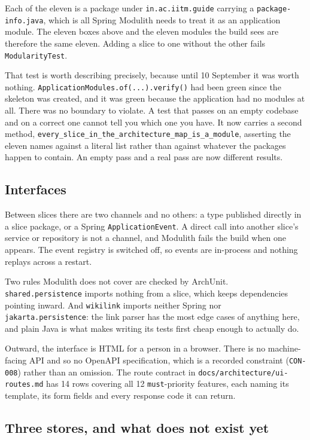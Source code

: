 \documentclass[11pt]{article}
\begin{document}
Each of the eleven is a package under \texttt{in.ac.iitm.guide} carrying a \texttt{package-info.java},
which is all Spring Modulith needs to treat it as an application module. The eleven boxes above and
the eleven modules the build sees are therefore the same eleven. Adding a slice to one without the
other fails \texttt{ModularityTest}.

That test is worth describing precisely, because until 10 September it was worth nothing.
\texttt{ApplicationModules.of(...).verify()} had been green since the skeleton was created, and it
was green because the application had no modules at all. There was no boundary to violate. A test
that passes on an empty codebase and on a correct one cannot tell you which one you have. It now
carries a second method, \texttt{every\_slice\_in\_the\_architecture\_map\_is\_a\_module}, asserting
the eleven names against a literal list rather than against whatever the packages happen to contain.
An empty pass and a real pass are now different results.

\subsection{Interfaces}

Between slices there are two channels and no others: a type published directly in a slice package,
or a Spring \texttt{ApplicationEvent}. A direct call into another slice's service or repository is
not a channel, and Modulith fails the build when one appears. The event registry is switched off, so
events are in-process and nothing replays across a restart.

Two rules Modulith does not cover are checked by ArchUnit. \texttt{shared.persistence} imports
nothing from a slice, which keeps dependencies pointing inward. And \texttt{wikilink} imports neither
Spring nor \texttt{jakarta.persistence}: the link parser has the most edge cases of anything here,
and plain Java is what makes writing its tests first cheap enough to actually do.

Outward, the interface is HTML for a person in a browser. There is no machine-facing API and so no
OpenAPI specification, which is a recorded constraint (\texttt{CON-008}) rather than an omission. The
route contract in \texttt{docs/architecture/ui-routes.md} has 14 rows covering all 12
\texttt{must}-priority features, each naming its template, its form fields and every response code it
can return.

\subsection{Three stores, and what does not exist yet}
\end{document}
